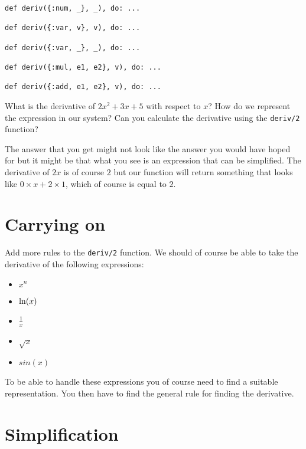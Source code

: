 \documentclass[a4paper,11pt]{article}
\begin{document}
\begin{verbatim}
def deriv({:num, _}, _), do: ...

def deriv({:var, v}, v), do: ...

def deriv({:var, _}, _), do: ...

def deriv({:mul, e1, e2}, v), do: ...

def deriv({:add, e1, e2}, v), do: ...
\end{verbatim}

What is the derivative of $2x^{2} + 3x + 5$ with respect to $x$? How do
we represent the expression in our system? Can you calculate the
derivative using the {\tt deriv/2} function?

The answer that you get might not look like the answer you would have
hoped for but it might be that what you see is an expression that can
be simplified. The derivative of $2x$ is of course $2$ but our function
will return something that looks like $0 \times x + 2 \times 1$, which of course is equal to $2$.



\section{Carrying on}

Add more rules to the {\tt deriv/2} function. We should of course be
able to take the derivative of the following expressions:

\begin{itemize}
\item $x^n$
\item ${\rm ln}(x)$
\item $\frac{1}{x}$
\item $\sqrt{x}$
\item $sin(x)$
\end{itemize}

To be able to handle these expressions you of course need to find a
suitable representation. You then have to find the general rule for
finding the derivative.



\section{Simplification}
\end{document}
